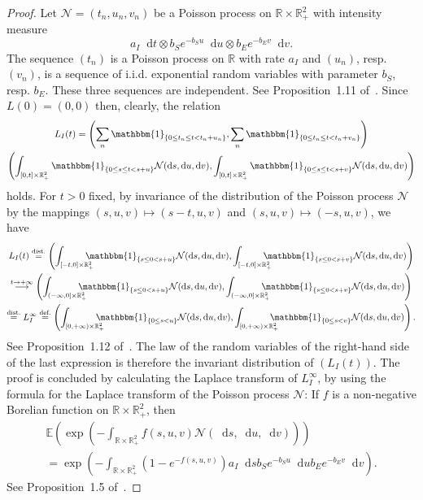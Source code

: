 \documentclass[english]{amsart}
\newcommand{\R}{\ensuremath{\mathbb{R}}}
\newcommand{\E}{\ensuremath{\mathbb{E}}}
\newcommand{\ind}[1]{\ensuremath{\mathbbm{1}_{\left\{#1\right\}}}}
\newcommand{\diff}{\mathop{}\mathopen{}\mathrm{d}}
\newcommand{\cal}[1]{\ensuremath{\mathcal{#1}}}
\newcommand\steq[1]{\stackrel{\text{\rm #1.}}{=}}
\numberwithin{proposition}{section}
\begin{document}
\begin{proof}
Let ${\cal N}{=}(t_n,u_n,v_n)$ be a Poisson process on $\R{\times}\R_+^2$ with intensity measure
  \[
  a_I\diff t\otimes b_S e^{-b_Su}\diff u\otimes b_E e^{-b_Ev}\diff v.
  \]
The sequence $(t_n)$ is a Poisson process on $\R$ with rate  $a_I$ and $(u_n)$, resp. $(v_n)$,  is a sequence of i.i.d. exponential random variables with parameter $b_S$, resp. $b_E$. These three sequences are independent. See Proposition~1.11 of~\citet{Robert}.
Since $L(0)=(0,0)$ then, clearly, the relation
\begin{multline*}
  L_I(t)=\left(\sum_{n}\ind{0\le t_n\le t< t_n{+}u_n},\sum_{n}\ind{0\le t_n\le t< t_n{+}v_n}\right)\\
  \left(\int_{[0, t]\times \R_+^2}\ind{0\le s\le t< s{+}u} {\cal N}(\diff s,\diff u, \diff v),\int_{[0, t]\times \R_+^2}\ind{0\le s\le t< s{+}v} {\cal N}(\diff s,\diff u, \diff v)\right)
\end{multline*}
holds. For $t{>}0$ fixed, by  invariance of the distribution of the Poisson process ${\cal N}$ by the mappings $(s,u,v){\mapsto}(s{-}t,u,v)$ and $(s,u,v){\mapsto}({-}s,u,v)$, we have 
\begin{multline*}
  L_I(t)\steq{dist}  \left(\int_{[-t, 0]\times \R_+^2}\hspace{-4mm}\ind{ s\le 0< s{+}u} {\cal N}(\diff s,\diff u, \diff v),\int_{[-t, 0]\times \R_+^2}\hspace{-4mm}\ind{s\le 0< s{+}v} {\cal N}(\diff s,\diff u, \diff v)\right)\\
  \stackrel{t\to+\infty}{\longrightarrow} 
  \left(\int_{(-\infty, 0]\times \R_+^2}\hspace{-4mm}\ind{ s\le 0< s{+}u} {\cal N}(\diff s,\diff u, \diff v),\int_{(-\infty, 0]\times \R_+^2}\hspace{-4mm}\ind{s\le 0< s{+}v} {\cal N}(\diff s,\diff u, \diff v)\right)\\
  \steq{dist}
    L_I^\infty \steq{def}\left(\int_{[0, +\infty)\times \R_+^2}\hspace{-4mm}\ind{  0\le s< u} {\cal N}(\diff s,\diff u, \diff v),\int_{[0, +\infty)\times \R_+^2}\hspace{-4mm}\ind{0\le s< v} {\cal N}(\diff s,\diff u, \diff v)\right).
\end{multline*}
See Proposition~1.12 of~\citet{Robert}. The law of the random variables of the right-hand side of the last expression is therefore the invariant distribution of $(L_I(t))$. The proof is concluded by calculating the Laplace transform of $L_I^\infty$, by using the formula for the Laplace transform of the Poisson process ${\cal N}$: If $f$ is a non-negative Borelian function on $\R{\times}\R_+^2$, then
\begin{multline*}
  \E\left(\exp\left(-\int_{\R{\times}\R_+^2}f(s,u,v){\cal N}(\diff s,\diff u,\diff v)\right)\right)\\
  =\exp\left(-\int_{\R{\times}\R_+^2}\left(1{-}e^{-f(s,u,v)}\right)  a_I\diff s b_S e^{-b_Su}\diff u b_E e^{-b_Ev}\diff v\right).
\end{multline*}
See Proposition~1.5 of~\citet{Robert}.
\end{proof}
\end{document}
